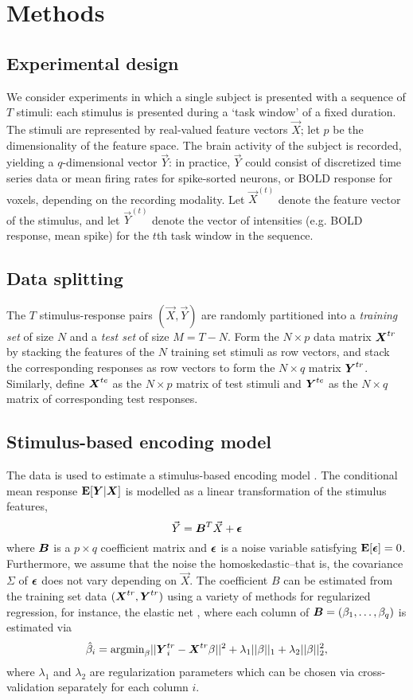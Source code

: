 \documentclass[12pt]{article}
\begin{document}
\section{Methods}

\subsection{Experimental design}

We consider experiments in which a single subject is presented with a
sequence of $T$ stimuli: each stimulus is presented during a `task
window' of a fixed duration.  The stimuli are represented by
real-valued feature vectors $\vec{X}$; let $p$ be the dimensionality of
the feature space.  The brain activity of the subject is recorded,
yielding a $q$-dimensional vector $\vec{Y}$: in practice, $\vec{Y}$ could
consist of discretized time series data or mean firing rates for
spike-sorted neurons, or BOLD response for voxels, depending on the
recording modality.  Let $\vec{X}^{(t)}$ denote the feature vector of the
stimulus, and let $\vec{Y}^{(t)}$ denote the vector of intensities
(e.g. BOLD response, mean spike) for the $t$th task window in the
sequence.

\subsection{Data splitting}

The $T$ stimulus-response pairs $(\vec{X}, \vec{Y})$ are randomly
partitioned into a \emph{training set} of size $N$ and a \emph{test
set} of size $M = T-N$.  Form the $N \times p$ data matrix $\boldsymbol{X}^{tr}$
by stacking the features of the $N$ training set stimuli as row
vectors, and stack the corresponding responses as row vectors to form
the $N \times q$ matrix $\boldsymbol{Y}^{tr}$.  Similarly, define $\boldsymbol{X}^{te}$ as
the $N \times p$ matrix of test stimuli and $\boldsymbol{Y}^{te}$ as the
$N \times q$ matrix of corresponding test responses.

\subsection{Stimulus-based encoding model}

The data is used to estimate a stimulus-based encoding
model \cite{Kay2008a}\cite{Naselaris2011}\cite{Mitchell2008}.
The conditional mean response $\textbf{E}[\boldsymbol{Y}|\boldsymbol{X}]$ is modelled as
a linear transformation of the stimulus features,
\[
\vec{Y} = \boldsymbol{B}^T \vec{X} + \boldsymbol{\epsilon}
\]
where $\boldsymbol{B}$ is a $p \times q$ coefficient matrix and $\boldsymbol{\epsilon}$ is a
noise variable satisfying $\textbf{E}[\boldsymbol{\epsilon}] = 0$.  Furthermore, we assume
that the noise the homoskedastic--that is, the covariance $\Sigma$ of
$\boldsymbol{\epsilon}$ does not vary depending on $\vec{X}$.  The coefficient $B$
can be estimated from the training set data $(\boldsymbol{X}^{tr}, \boldsymbol{Y}^{tr})$
using a variety of methods for regularized regression, for instance,
the elastic net \cite{Zou2005}, where each column of $\boldsymbol{B} =
(\beta_1,\hdots, \beta_q)$ is estimated via
\[
\hat{\beta}_i = \text{argmin}_\beta ||\boldsymbol{Y}_i^{tr} - \boldsymbol{X}^{tr} \beta||^2 + \lambda_1 ||\beta||_1 + \lambda_2 ||\beta||_2^2,
\]
where $\lambda_1$ and $\lambda_2$ are regularization parameters which
can be chosen via cross-validation \cite{Hastie2009a} separately for
each column $i$.
\end{document}
